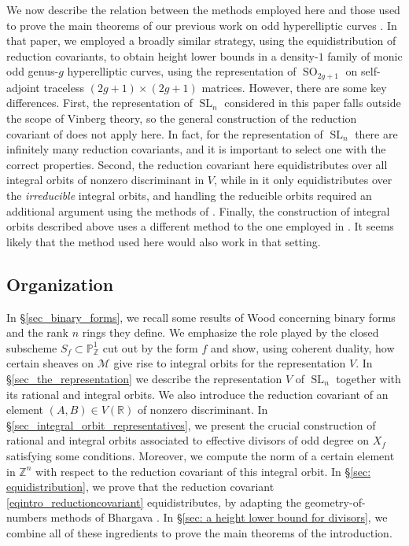 \documentclass{article} %
\numberwithin{equation}{section}
\DeclareMathOperator{\SL}{SL}
\DeclareMathOperator{\SO}{SO}
\renewcommand{\P}{\mathbb{P}}
\newcommand{\R}{\mathbb{R}}
\newcommand{\Z}{\mathbb{Z}}
\begin{document}
We now describe the relation between the methods employed here and those used to prove the main theorems of our previous work on odd hyperelliptic curves \cite{lagathorne2024smallheightoddhyperelliptic}. In that paper, we employed a broadly similar strategy, using the equidistribution of reduction covariants, to obtain height lower bounds in a density-$1$ family of monic odd genus-$g$ hyperelliptic curves, using the representation of $\SO_{2g+1}$ on self-adjoint traceless $(2g+1)\times (2g+1)$ matrices. However, there are some key differences. 
First, the representation of $\SL_n$ considered in this paper falls outside the scope of Vinberg theory, so the general construction of the reduction covariant of \cite{Thorne-reduction} does not apply here. In fact, for the representation of $\SL_n$ there are infinitely many reduction covariants, and it is important to select one with the correct properties. 
Second, the reduction covariant here equidistributes over all integral orbits of nonzero discriminant in $V$, while in \cite{lagathorne2024smallheightoddhyperelliptic} it only equidistributes over the \emph{irreducible} integral orbits, and handling the reducible orbits required an additional argument using the methods of \cite{Bhargava-squarefree}. 
Finally, the construction of integral orbits described above uses a different method to the one employed in \cite{lagathorne2024smallheightoddhyperelliptic}. It seems likely that the method used here would also work in that setting. 

\subsection{Organization}

In \S\ref{sec_binary_forms}, we recall some results of Wood \cite{Woo11, Woo14} concerning binary forms and the rank $n$ rings they define.
We emphasize the role played by the closed subscheme $S_f\subset \P^1_{\Z}$ cut out by the form $f$ and show, using coherent duality, how certain sheaves on $\mathcal{M}$ give rise to integral orbits for the representation $V$.
In \S\ref{sec_the_representation} we describe the representation $V$ of $\SL_n$ together with its rational and integral orbits.
We also introduce the reduction covariant of an element $(A,B) \in V(\R)$ of nonzero discriminant.
In \S\ref{sec_integral_orbit_representatives}, we present the crucial construction of rational and integral orbits associated to effective divisors of odd degree on $X_f$ satisfying some conditions.
Moreover, we compute the norm of a certain element in $\Z^n$ with respect to the reduction covariant of this integral orbit.
In \S\ref{sec: equidistribution}, we prove that the reduction covariant \eqref{eqintro_reductioncovariant} equidistributes, by adapting the geometry-of-numbers methods of Bhargava \cite{bhargava2015mosthyperellipticarepointless}.
In \S\ref{sec: a height lower bound for divisors}, we combine all of these ingredients to prove the main theorems of the introduction.
\end{document}
